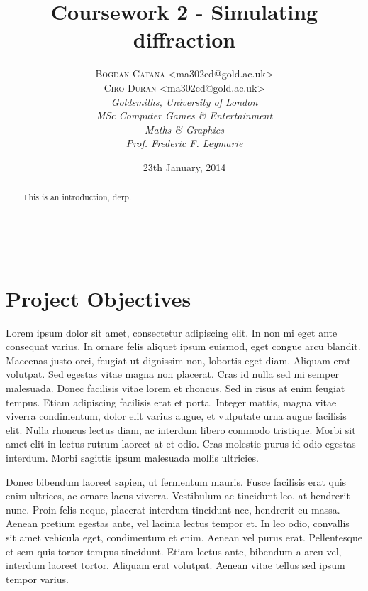 \documentclass[a4paper, 11pt]{article} %
\title{\textbf{Coursework 2 - Simulating diffraction}\\ %
} %
\author{\textsc{Bogdan Catana} \textless ma302cd@gold.ac.uk\textgreater \\%
\textsc{Ciro Duran} \textless ma302cd@gold.ac.uk\textgreater 
\\{\textit{Goldsmiths, University of London\\MSc Computer Games \& Entertainment\\Maths \& Graphics\\Prof. Frederic F. Leymarie}}} %
\date{23th January, 2014} %
\makeatletter
\renewcommand{\maketitle}{ %
\begin{flushright} %
{\LARGE\@title} %

\vspace{50pt} %

{\large\@author} %
\\\@date %

\vspace{40pt} %
\end{flushright}
}
\makeatother
\begin{document}
\maketitle %


\renewcommand{\abstractname}{Introduction} %

\begin{abstract}
This is an introduction, derp.
\end{abstract}

\vspace{30pt} %


\section*{Project Objectives}

Lorem ipsum dolor sit amet, consectetur adipiscing elit. In non mi eget ante consequat varius. In ornare felis aliquet ipsum euismod, eget congue arcu blandit. Maecenas justo orci, feugiat ut dignissim non, lobortis eget diam. Aliquam erat volutpat. Sed egestas vitae magna non placerat. Cras id nulla sed mi semper malesuada. Donec facilisis vitae lorem et rhoncus. Sed in risus at enim feugiat tempus. Etiam adipiscing facilisis erat et porta. Integer mattis, magna vitae viverra condimentum, dolor elit varius augue, et vulputate urna augue facilisis elit. Nulla rhoncus lectus diam, ac interdum libero commodo tristique. Morbi sit amet elit in lectus rutrum laoreet at et odio. Cras molestie purus id odio egestas interdum. Morbi sagittis ipsum malesuada mollis ultricies.

Donec bibendum laoreet sapien, ut fermentum mauris. Fusce facilisis erat quis enim ultrices, ac ornare lacus viverra. Vestibulum ac tincidunt leo, at hendrerit nunc. Proin felis neque, placerat interdum tincidunt nec, hendrerit eu massa. Aenean pretium egestas ante, vel lacinia lectus tempor et. In leo odio, convallis sit amet vehicula eget, condimentum et enim. Aenean vel purus erat. Pellentesque et sem quis tortor tempus tincidunt. Etiam lectus ante, bibendum a arcu vel, interdum laoreet tortor. Aliquam erat volutpat. Aenean vitae tellus sed ipsum tempor varius.


\clearpage





\end{document}
